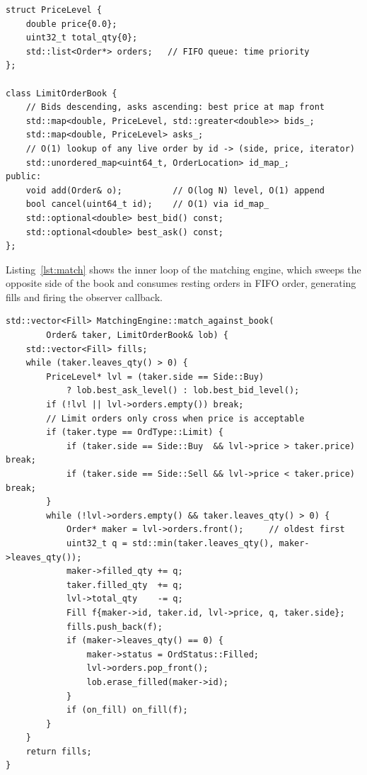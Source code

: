 \documentclass[12pt,oneside,a4paper]{report}
\begin{document}
\begin{lstlisting}[style=cppstyle,caption={Limit order book data structures with FIFO price levels},label={lst:orderbook}]
struct PriceLevel {
    double price{0.0};
    uint32_t total_qty{0};
    std::list<Order*> orders;   // FIFO queue: time priority
};

class LimitOrderBook {
    // Bids descending, asks ascending: best price at map front
    std::map<double, PriceLevel, std::greater<double>> bids_;
    std::map<double, PriceLevel> asks_;
    // O(1) lookup of any live order by id -> (side, price, iterator)
    std::unordered_map<uint64_t, OrderLocation> id_map_;
public:
    void add(Order& o);          // O(log N) level, O(1) append
    bool cancel(uint64_t id);    // O(1) via id_map_
    std::optional<double> best_bid() const;
    std::optional<double> best_ask() const;
};
\end{lstlisting}

Listing~\ref{lst:match} shows the inner loop of the matching engine, which sweeps the opposite side of the book and consumes resting orders in FIFO order, generating fills and firing the observer callback.

\begin{lstlisting}[style=cppstyle,caption={Matching engine inner loop enforcing price-time priority},label={lst:match}]
std::vector<Fill> MatchingEngine::match_against_book(
        Order& taker, LimitOrderBook& lob) {
    std::vector<Fill> fills;
    while (taker.leaves_qty() > 0) {
        PriceLevel* lvl = (taker.side == Side::Buy)
            ? lob.best_ask_level() : lob.best_bid_level();
        if (!lvl || lvl->orders.empty()) break;
        // Limit orders only cross when price is acceptable
        if (taker.type == OrdType::Limit) {
            if (taker.side == Side::Buy  && lvl->price > taker.price) break;
            if (taker.side == Side::Sell && lvl->price < taker.price) break;
        }
        while (!lvl->orders.empty() && taker.leaves_qty() > 0) {
            Order* maker = lvl->orders.front();     // oldest first
            uint32_t q = std::min(taker.leaves_qty(), maker->leaves_qty());
            maker->filled_qty += q;
            taker.filled_qty  += q;
            lvl->total_qty    -= q;
            Fill f{maker->id, taker.id, lvl->price, q, taker.side};
            fills.push_back(f);
            if (maker->leaves_qty() == 0) {
                maker->status = OrdStatus::Filled;
                lvl->orders.pop_front();
                lob.erase_filled(maker->id);
            }
            if (on_fill) on_fill(f);
        }
    }
    return fills;
}
\end{lstlisting}
\end{document}
